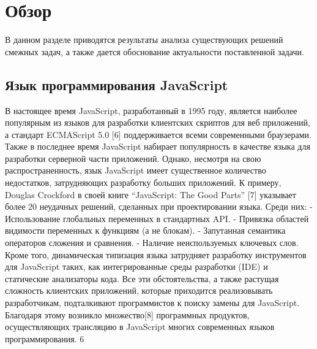 \chapter{Обзор}



В данном разделе приводятся результаты анализа существующих решений смежных
задач, а также дается обоснование актуальности поставленной задачи.

\section{Язык программирования JavaScript}

В настоящее время JavaScript, разработанный в 1995 году, является наиболее
популярным из языков для разработки клиентских скриптов для веб приложений, а стандарт
ECMAScript 5.0 [6] поддерживается всеми современными браузерами. Также в последнее
время JavaScript набирает популярность в качестве языка для разработки серверной части
приложений.
Однако, несмотря на свою распространенность, язык JavaScript имеет существенное
количество недостатков, затрудняющих разработку больших приложений. К примеру,
Douglas Crockford
в своей книге “JavaScript: The Good Parts” [7] указывает более 20
неудачных решений, сделанных при проектировании языка. Среди них:
- Использование глобальных переменных в стандартных API.
- Привязка областей видимости переменных к функциям (а не блокам).
- Запутанная семантика операторов сложения и сравнения.
- Наличие неиспользуемых ключевых слов.
Кроме того, динамическая типизация языка затрудняет разработку инструментов для
JavaScript таких, как интегрированные среды разработки (IDE) и статические анализаторы
кода.
Все эти обстоятельства, а также растущая сложность клиентских приложений,
которые приходится реализовывать разработчикам, подталкивают программистов к поиску
замены для JavaScript. Благодаря этому возникло множество[8] программных продуктов,
осуществляющих трансляцию в JavaScript многих современных языков программирования.
6

